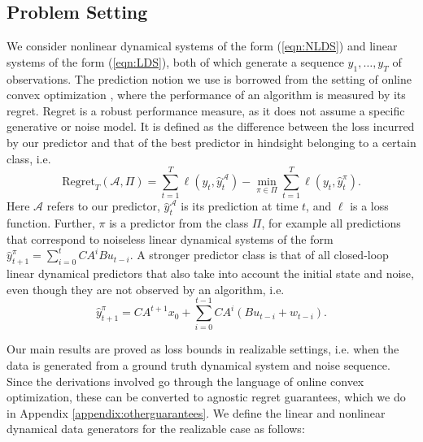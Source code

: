 \documentclass[11pt]{article}
\def\reals{{\mathbb R}}
\def\reals{{\mathbb R}}
\def\mA{{\mathcal A}}
\def\mA{{\mathcal A}}
\def\regret{\ensuremath{\mbox{Regret}}}
\numberwithin{equation}{section}
\begin{document}
\subsection{Problem Setting}
We consider nonlinear dynamical systems of the form (\ref{eqn:NLDS}) and linear systems of the form (\ref{eqn:LDS}), both of which generate a sequence $y_1, \ldots, y_T$ of observations.
The prediction notion we use is borrowed from the setting of online convex optimization \cite{hazan2016introduction}, where the performance of an algorithm is measured by its regret. Regret is a robust performance measure, as it does not assume a specific generative or noise model. It is defined as the difference between the loss incurred by our predictor and that of the best predictor in hindsight belonging to a certain class, i.e. 
\begin{equation*} \label{eqn:regret}
\regret_T(\mA, \Pi) = \sum_{t=1}^T \ell(y_t,\hat{y}_t^\mA ) - \min_{\pi \in \Pi} \sum_{t=1}^T \ell(y_t,\hat{y}_t^\pi) . 
\end{equation*}
Here $\mA$ refers to our predictor, $\hat{y}_t^\mA$ is its prediction at time $t$, and $\ell$ is a loss function. Further, $\pi$ is a predictor from the class $\Pi$, for example all predictions that correspond to noiseless linear dynamical systems of the form $\hat{y}_{t+1}^\pi = \sum_{i=0}^t C A^i B u_{t-i} $. A stronger predictor class is that of all closed-loop linear dynamical predictors that also take into account the initial state and noise, even though they are not observed by an algorithm, i.e. 
$$\hat{y}_{t+1}^\pi = CA^{t+1}x_0 + \sum_{i=0}^{t-1} C A^i (B u_{t-i} + w_{t-i}).
$$

Our main results are proved as loss bounds in realizable settings, i.e. when the data is generated from a ground truth dynamical system and noise sequence. Since the derivations involved go through the language of online convex optimization, these can be converted to agnostic regret guarantees, which we do in Appendix \ref{appendix:otherguarantees}. We define the linear and nonlinear dynamical data generators for the realizable case as follows: 
\end{document}
